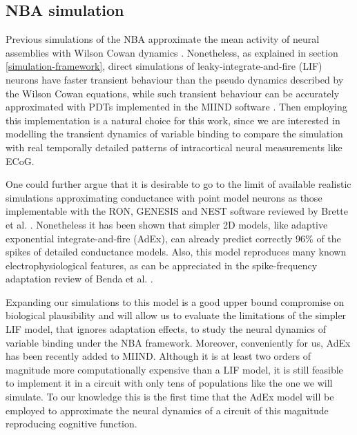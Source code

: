 \documentclass[10pt]{article}
\begin{document}
\subsection{NBA simulation}\label{architectural-decisions}

Previous simulations of the NBA approximate the mean activity of neural assemblies with Wilson Cowan dynamics \cite{Frank_2014}.
Nonetheless, as explained in section \ref{simulation-framework}, direct simulations of leaky-integrate-and-fire (LIF) neurons \cite{omurtag2000simulation} have faster transient behaviour than the pseudo dynamics described by the Wilson Cowan equations, while such transient behaviour can be accurately approximated with PDTs \cite{de2013generic} implemented in the MIIND software \cite{de_Kamps_2008}.
Then employing this implementation is a natural choice for this work, since we are interested in modelling the transient dynamics of variable binding to compare the simulation with real temporally detailed patterns of intracortical neural measurements like ECoG.

One could further argue that it is desirable to go to the limit of available realistic simulations approximating conductance with point model neurons as those implementable with the RON, GENESIS and NEST software reviewed by Brette et al. \cite{brette2007simulation}.
Nonetheless it has been shown that simpler 2D models, like adaptive exponential integrate-and-fire (AdEx), can already predict correctly 96\% of the spikes of detailed conductance models\cite{brette2005adaptive}.
Also, this model reproduces many known electrophysiological features, as can be appreciated in the spike-frequency adaptation review of Benda et al. \cite{Benda_2003,Benda_2014}.

Expanding our simulations to this model is a good upper bound compromise on biological plausibility and will allow us to evaluate the limitations of the simpler LIF model, that ignores adaptation effects, to study the neural dynamics of variable binding under the NBA framework.
Moreover, conveniently for us, AdEx has been recently added to MIIND. Although it is at least two orders of magnitude more computationally expensive than a LIF model, it is still feasible to implement it in a circuit with only tens of populations like the one we will simulate.
To our knowledge this is the first time that the AdEx model will be employed to approximate the neural dynamics of a circuit of this magnitude reproducing cognitive function.
\end{document}
